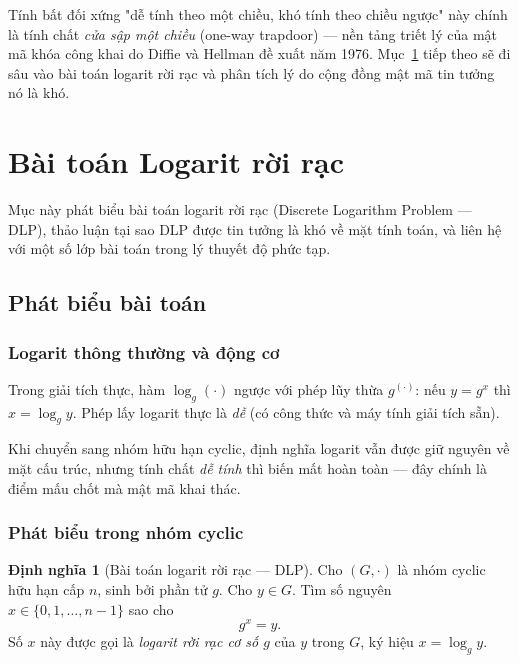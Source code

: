 \documentclass[12pt,a4paper]{report}
\theoremstyle{definition}
\newtheorem{definition}[theorem]{Định nghĩa}
\theoremstyle{remark}
\begin{document}
Tính bất đối xứng "dễ tính theo một chiều, khó tính theo chiều ngược" này chính là tính chất \emph{cửa sập một chiều} (one-way trapdoor) --- nền tảng triết lý của mật mã khóa công khai do Diffie và Hellman đề xuất năm 1976. Mục~\ref{sec:dlp} tiếp theo sẽ đi sâu vào bài toán logarit rời rạc và phân tích lý do cộng đồng mật mã tin tưởng nó là khó.

\section{Bài toán Logarit rời rạc}
\label{sec:dlp}

Mục này phát biểu bài toán logarit rời rạc (Discrete Logarithm Problem --- DLP), thảo luận tại sao DLP được tin tưởng là khó về mặt tính toán, và liên hệ với một số lớp bài toán trong lý thuyết độ phức tạp.

\subsection{Phát biểu bài toán}
\label{subsec:dlp-statement}

\subsubsection{Logarit thông thường và động cơ}

Trong giải tích thực, hàm $\log_g(\cdot)$ ngược với phép lũy thừa $g^{(\cdot)}$: nếu $y = g^x$ thì $x = \log_g y$. Phép lấy logarit thực là \emph{dễ} (có công thức và máy tính giải tích sẵn).

Khi chuyển sang nhóm hữu hạn cyclic, định nghĩa logarit vẫn được giữ nguyên về mặt cấu trúc, nhưng tính chất \emph{dễ tính} thì biến mất hoàn toàn --- đây chính là điểm mấu chốt mà mật mã khai thác.

\subsubsection{Phát biểu trong nhóm cyclic}

\begin{definition}[Bài toán logarit rời rạc --- DLP]
\label{def:dlp}
Cho $(G, \cdot)$ là nhóm cyclic hữu hạn cấp $n$, sinh bởi phần tử $g$. Cho $y \in G$. Tìm số nguyên $x \in \{0, 1, \ldots, n-1\}$ sao cho
\[
g^x = y.
\]
Số $x$ này được gọi là \emph{logarit rời rạc cơ số $g$} của $y$ trong $G$, ký hiệu $x = \log_g y$.
\end{definition}
\end{document}
